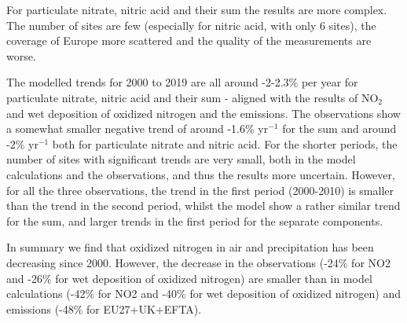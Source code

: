 For particulate nitrate, nitric acid and their sum the results are more complex. The number of sites are few (especially for nitric acid, with only 6 sites), the coverage of Europe more scattered and the quality of the measurements are worse. 

The modelled trends for 2000 to 2019 are all around -2-2.3\% per year for particulate nitrate, nitric acid and their sum - aligned with the results of NO$_2$ and wet deposition of oxidized nitrogen and the emissions. The observations show a somewhat smaller negative trend of around -1.6\% yr$^{-1}$ for the sum and around -2\% yr$^{-1}$ both for particulate nitrate and nitric acid. For the shorter periods, the number of sites with significant trends are very small, both in the model calculations and the observations, and thus the results more uncertain.
However, for all the three observations, the trend in the first period (2000-2010) is smaller than the trend in the second period, whilst the model show a rather similar trend for the sum, and larger trends in the first period for the separate components.

In summary we find that oxidized nitrogen in air and precipitation has been decreasing since 2000. However, the decrease in the observations (-24\% for NO2 and -26\% for wet deposition of oxidized nitrogen) are smaller than in model calculations (-42\% for NO2 and -40\% for wet deposition of oxidized nitrogen) and emissions (-48\% for EU27+UK+EFTA). 

